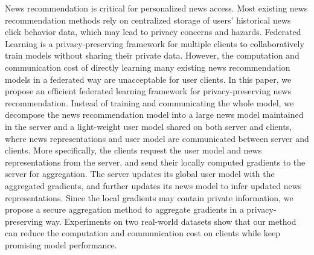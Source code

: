 News recommendation is critical for personalized news access. Most existing news recommendation methods rely on centralized storage of users' historical news click behavior data, which may lead to privacy concerns and hazards. Federated Learning is a privacy-preserving framework for multiple clients to collaboratively train models without sharing their private data. However, the computation and communication cost of directly learning many existing news recommendation models in a federated way are unacceptable for user clients. In this paper, we propose an efficient federated learning framework for privacy-preserving news recommendation. Instead of training and communicating the whole model, we decompose the news recommendation model into a large news model maintained in the server and a light-weight user model shared on both server and clients, where news representations and user model are communicated between server and clients. More specifically, the clients request the user model and news representations from the server, and send their locally computed gradients to the server for aggregation. The server updates its global user model with the aggregated gradients, and further updates its news model to infer updated news representations. Since the local gradients may contain private information, we propose a secure aggregation method to aggregate gradients in a privacy-preserving way. Experiments on two real-world datasets show that our method can reduce the computation and communication cost on clients while keep promising model performance.
